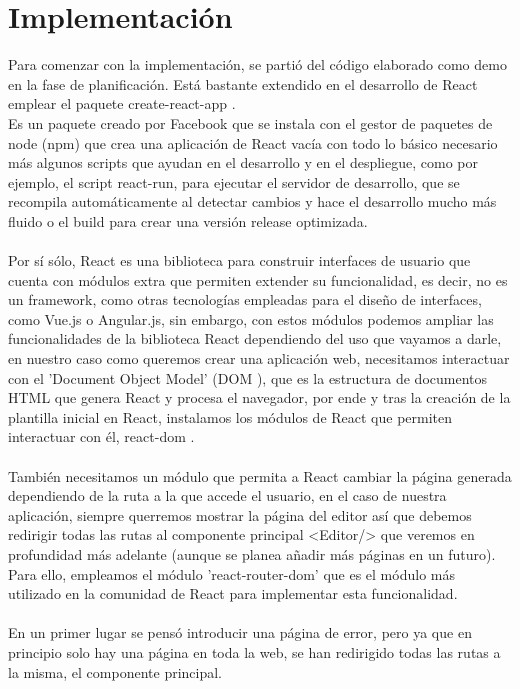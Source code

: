 \chapter{Implementación}
Para comenzar con la implementación, se partió del código elaborado como demo en la fase 
de planificación.
Está bastante extendido en el desarrollo de React emplear el paquete create-react-app 
\cite{create-react-app}.
\\
Es un paquete creado por Facebook que se instala con el gestor de paquetes de node 
(npm) que crea una aplicación de React vacía con todo lo básico necesario más 
algunos scripts que ayudan en el desarrollo y en el despliegue, como por ejemplo, el 
script react-run, para ejecutar el servidor de desarrollo, que se recompila
automáticamente al detectar cambios y hace el desarrollo mucho más fluido o el build
para crear una versión release optimizada.
\\\\
Por sí sólo, React es una biblioteca para construir interfaces de usuario que cuenta con
módulos extra que permiten extender su funcionalidad, es decir, no es un framework, como
otras tecnologías empleadas para el diseño de interfaces, como Vue.js o Angular.js, 
sin embargo, con estos módulos podemos ampliar las funcionalidades de la biblioteca React 
dependiendo del uso que vayamos a darle, en nuestro caso como queremos crear una aplicación
web, necesitamos interactuar con el 'Document Object Model' (DOM \cite{DOM}), que es la estructura
de documentos HTML que genera React y procesa el navegador, por ende y tras la creación de 
la plantilla inicial en React, instalamos los módulos de React que permiten interactuar 
con él, react-dom \cite{react-dom}.
\\\\
También necesitamos un módulo que permita a React cambiar la página generada dependiendo de la 
ruta a la que accede el usuario, en el caso de nuestra aplicación, siempre querremos mostrar 
la página del editor así que debemos redirigir todas las rutas al componente principal <Editor/>
que veremos en profundidad más adelante (aunque se planea añadir más páginas en un futuro).
Para ello, empleamos el módulo 'react-router-dom' \cite{react-router-dom} que es el módulo
más utilizado en la comunidad de React para implementar esta funcionalidad.
\\\\
En un primer lugar se pensó introducir una página de error, pero ya que en principio solo hay una
página en toda la web, se han redirigido todas las rutas a la misma, el componente principal.

